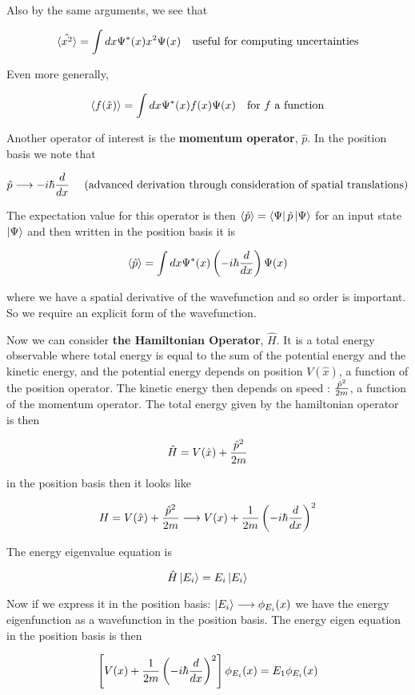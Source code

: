 \documentclass[english, 11pt]{article}
\begin{document}
\begin{itemize}
      Also by the same arguments, we see that

      \[ \langle \hat{x^2} \rangle = \int dx \Psi^*(x) x^2 \Psi(x) \ \ \ \mbox{useful for computing uncertainties} \]

      Even more generally,

      \[ \langle f(\hat{x}) \rangle = \int dx \Psi^*(x) f(x) \Psi(x) \ \ \ \mbox{for $f$ a function} \]

      Another operator of interest is the \textbf{momentum operator}, $\hat{p}$. In the position basis we note that

      \[ \hat{p} \longrightarrow -i\hbar \frac{d}{dx} \ \ \ \ \mbox{(advanced derivation through consideration of spatial translations)} \]

      The expectation value for this operator is then $\langle \hat{p} \rangle = \left\langle\Psi\right|\hat{p}\left|\Psi\right\rangle$ for an input state $\left|\Psi\right\rangle$ and then written in the position basis it is

      \[ \langle \hat{p} \rangle = \int dx \Psi^*(x) \left( -i\hbar \frac{d}{dx} \right) \Psi(x) \]

      where we have a spatial derivative of the wavefunction and so order is important. So we require an explicit form of the wavefunction.\newline

      Now we can consider \textbf{the Hamiltonian Operator}, $\hat{H}$. It is a total energy observable where total energy is equal to the sum of the potential energy and the kinetic energy, and the potential energy depends on position $V(\hat{x})$, a function of the position operator. The kinetic energy then depends on speed : $\frac{\hat{p}^2}{2m}$, a function of the momentum operator. The total energy given by the hamiltonian operator is then

      \[ \hat{H} = V(\hat{x}) + \frac{\hat{p}^2}{2m} \]

      in the position basis then it looks like

      \[ H = V(\hat{x}) + \frac{\hat{p}^2}{2m} \longrightarrow V(x) + \frac{1}{2m} \left( -i\hbar \frac{d}{dx} \right)^2 \]

      The energy eigenvalue equation is

      \[ \hat{H}\left|E_i\right\rangle = E_i\left|E_i\right\rangle \]

      Now if we express it in the position basis: $\left|E_i\right\rangle \longrightarrow \phi_{E_i}(x)$ we have the energy eigenfunction as a wavefunction in the position basis. The energy eigen equation in the position basis is then

      \[ \left[ V(x) + \frac{1}{2m} \left( -i\hbar \frac{d}{d x} \right)^2 \right] \phi_{E_i}(x) = E_1 \phi_{E_i}(x) \]


\end{itemize}
\end{document}
